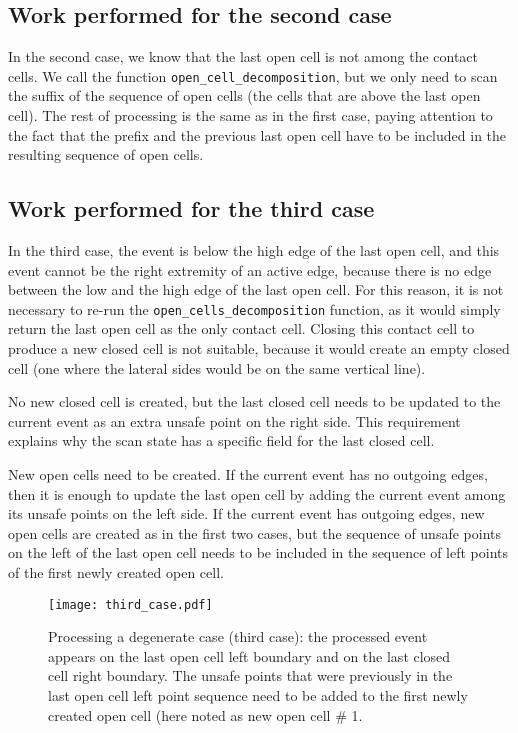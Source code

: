 \documentclass[a4paper, USenglish, cleveref, autoref, thm-restate, final]{lipics-v2021}
\begin{document}
\subsection{Work performed for the second case}
In the second case, we know that the last open cell is not among the
contact cells.  We call the function {\tt open\_cell\_decomposition},
but we only need to scan the suffix of the sequence of open cells (the
cells that are above the last open cell).  The rest of processing is
the same as in the first case, paying attention to the fact that the
prefix and the previous last open cell have to be included in the
resulting sequence of open cells.

\subsection{Work performed for the third case}
In the third case, the event is below the high edge of the last open
cell, and this event cannot be the right extremity of
an active edge, because there is no edge between the low and the high
edge of the last open cell.  For this reason, it is not necessary to
re-run the {\tt open\_cells\_decomposition} function, as it would
simply return the last open cell as the only contact cell.
Closing this contact cell to produce a new closed
cell is not suitable, because it would create an empty closed cell
(one where the lateral sides would be on the same vertical line).

No new closed cell is created, but the last closed cell needs to be
updated to the current event as an extra unsafe point on the right side.
This requirement explains why the scan state has a specific field for
the last closed cell.

New open cells need to be created.  If the current event has no
outgoing edges, then it is enough to update the last open cell by adding
the current event among its unsafe points on the left side.  If the
current event has outgoing edges, new open cells are created as in the
first two cases, but the sequence of unsafe points on the left of
the last open cell needs to be included in the sequence of left
points of the first newly created open cell.
\begin{figure}
\begin{center}
\texttt{[image: third\_case.pdf]}
\end{center}
\caption{Processing a degenerate case (third case):
  the processed event appears on
  the last open cell left boundary and on the last closed cell right
  boundary.  The unsafe points that were previously in the last open
  cell left point sequence need to be added to the first newly created
  open cell (here noted as {\sf new open cell \# 1}.
  }
\end{figure}
\end{document}

